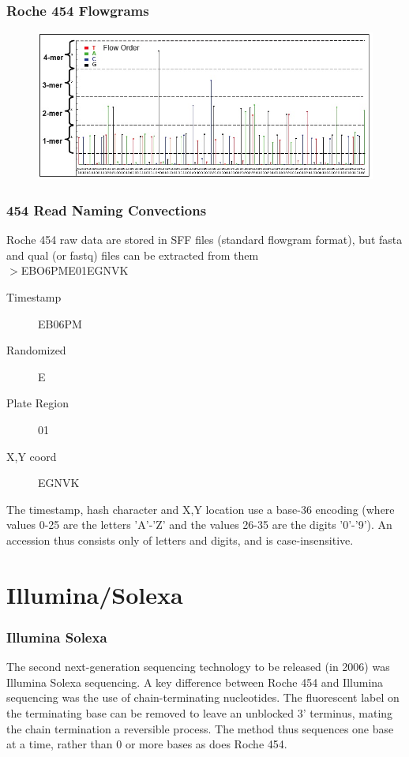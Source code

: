 \documentclass{beamer}
\begin{document}
\begin{frame}
  \frametitle{Roche 454 Flowgrams}
  \begin{center}
    \begin{figure}
    \includegraphics[scale=0.35]{Flowgram.jpg}
  \end{figure}
  \end{center}
\end{frame}

\begin{frame}
  \frametitle{454 Read Naming Convections}
Roche 454 raw data are stored in SFF files (standard flowgram format), but fasta and qual (or fastq) files can be extracted from them\\
  $>$EBO6PME01EGNVK
  \begin{description}
  \item[Timestamp] EB06PM
  \item[Randomized ] E
  \item[Plate Region] 01
  \item[X,Y coord] EGNVK
  \end{description}
  The timestamp, hash character and X,Y location use a base-36 encoding (where values 0-25 are the letters 'A'-'Z' and the values 26-35 are the digits '0'-'9'). An accession thus consists only of letters and digits, and is case-insensitive. 
\end{frame}
   

\section{Illumina/Solexa}

\begin{frame}
  \frametitle{Illumina Solexa}
  The second next-generation sequencing technology to be released (in 2006) was Illumina Solexa sequencing. A key difference between Roche 454 and Illumina sequencing was the use of chain-terminating nucleotides. The fluorescent label on the terminating base can be removed to leave an unblocked 3' terminus, mating the chain termination a reversible process. The method thus sequences one base at a time, rather than 0 or more bases as does Roche 454.
\end{frame}
\end{document}
